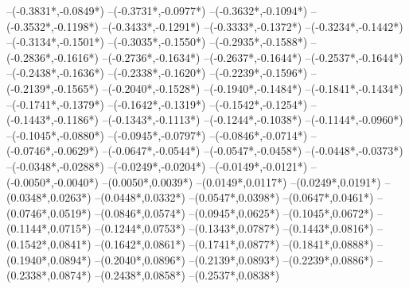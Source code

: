 {	--({-0.3831*\xskala},{-0.0849*\yskala})
	--({-0.3731*\xskala},{-0.0977*\yskala})
	--({-0.3632*\xskala},{-0.1094*\yskala})
	--({-0.3532*\xskala},{-0.1198*\yskala})
	--({-0.3433*\xskala},{-0.1291*\yskala})
	--({-0.3333*\xskala},{-0.1372*\yskala})
	--({-0.3234*\xskala},{-0.1442*\yskala})
	--({-0.3134*\xskala},{-0.1501*\yskala})
	--({-0.3035*\xskala},{-0.1550*\yskala})
	--({-0.2935*\xskala},{-0.1588*\yskala})
	--({-0.2836*\xskala},{-0.1616*\yskala})
	--({-0.2736*\xskala},{-0.1634*\yskala})
	--({-0.2637*\xskala},{-0.1644*\yskala})
	--({-0.2537*\xskala},{-0.1644*\yskala})
	--({-0.2438*\xskala},{-0.1636*\yskala})
	--({-0.2338*\xskala},{-0.1620*\yskala})
	--({-0.2239*\xskala},{-0.1596*\yskala})
	--({-0.2139*\xskala},{-0.1565*\yskala})
	--({-0.2040*\xskala},{-0.1528*\yskala})
	--({-0.1940*\xskala},{-0.1484*\yskala})
	--({-0.1841*\xskala},{-0.1434*\yskala})
	--({-0.1741*\xskala},{-0.1379*\yskala})
	--({-0.1642*\xskala},{-0.1319*\yskala})
	--({-0.1542*\xskala},{-0.1254*\yskala})
	--({-0.1443*\xskala},{-0.1186*\yskala})
	--({-0.1343*\xskala},{-0.1113*\yskala})
	--({-0.1244*\xskala},{-0.1038*\yskala})
	--({-0.1144*\xskala},{-0.0960*\yskala})
	--({-0.1045*\xskala},{-0.0880*\yskala})
	--({-0.0945*\xskala},{-0.0797*\yskala})
	--({-0.0846*\xskala},{-0.0714*\yskala})
	--({-0.0746*\xskala},{-0.0629*\yskala})
	--({-0.0647*\xskala},{-0.0544*\yskala})
	--({-0.0547*\xskala},{-0.0458*\yskala})
	--({-0.0448*\xskala},{-0.0373*\yskala})
	--({-0.0348*\xskala},{-0.0288*\yskala})
	--({-0.0249*\xskala},{-0.0204*\yskala})
	--({-0.0149*\xskala},{-0.0121*\yskala})
	--({-0.0050*\xskala},{-0.0040*\yskala})
	--({0.0050*\xskala},{0.0039*\yskala})
	--({0.0149*\xskala},{0.0117*\yskala})
	--({0.0249*\xskala},{0.0191*\yskala})
	--({0.0348*\xskala},{0.0263*\yskala})
	--({0.0448*\xskala},{0.0332*\yskala})
	--({0.0547*\xskala},{0.0398*\yskala})
	--({0.0647*\xskala},{0.0461*\yskala})
	--({0.0746*\xskala},{0.0519*\yskala})
	--({0.0846*\xskala},{0.0574*\yskala})
	--({0.0945*\xskala},{0.0625*\yskala})
	--({0.1045*\xskala},{0.0672*\yskala})
	--({0.1144*\xskala},{0.0715*\yskala})
	--({0.1244*\xskala},{0.0753*\yskala})
	--({0.1343*\xskala},{0.0787*\yskala})
	--({0.1443*\xskala},{0.0816*\yskala})
	--({0.1542*\xskala},{0.0841*\yskala})
	--({0.1642*\xskala},{0.0861*\yskala})
	--({0.1741*\xskala},{0.0877*\yskala})
	--({0.1841*\xskala},{0.0888*\yskala})
	--({0.1940*\xskala},{0.0894*\yskala})
	--({0.2040*\xskala},{0.0896*\yskala})
	--({0.2139*\xskala},{0.0893*\yskala})
	--({0.2239*\xskala},{0.0886*\yskala})
	--({0.2338*\xskala},{0.0874*\yskala})
	--({0.2438*\xskala},{0.0858*\yskala})
	--({0.2537*\xskala},{0.0838*\yskala})
}
